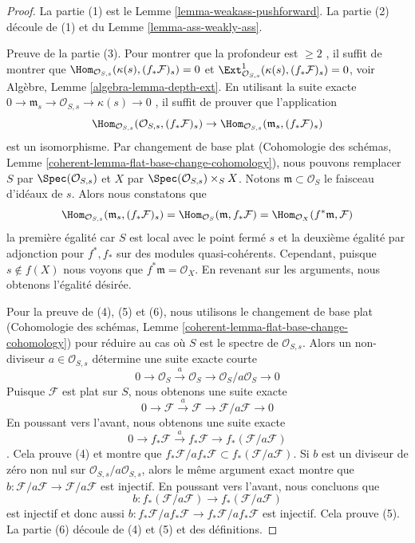 \begin{proof}
La partie (1) est le Lemme  \ref{lemma-weakass-pushforward}. La partie (2) découle de (1) et du Lemme
 \ref{lemma-ass-weakly-ass}.

\medskip\noindent
Preuve de la partie (3). Pour montrer que la profondeur est  $\geq 2$ , il
suffit de montrer que  $\Hom_{\mathcal{O}_{S, s}}(\kappa(s), (f_*\mathcal{F})_s) = 0$  et  $\Ext^1_{\mathcal{O}_{S, s}}(\kappa(s), (f_*\mathcal{F})_s) = 0$, voir Algèbre, Lemme
 \ref{algebra-lemma-depth-ext}. En utilisant la suite exacte  $0 \to \mathfrak m_s \to \mathcal{O}_{S, s} \to \kappa(s) \to 0$ , il suffit de prouver que
l'application
$$
\Hom_{\mathcal{O}_{S, s}}(\mathcal{O}_{S, s}, (f_*\mathcal{F})_s)
\to
\Hom_{\mathcal{O}_{S, s}}(\mathfrak m_s, (f_*\mathcal{F})_s)
$$
est un isomorphisme. Par changement de base plat (Cohomologie des schémas, Lemme
 \ref{coherent-lemma-flat-base-change-cohomology}), nous pouvons remplacer  $S$  par  $\Spec(\mathcal{O}_{S, s})$  et
 $X$  par  $\Spec(\mathcal{O}_{S, s}) \times_S X$. Notons  $\mathfrak m \subset \mathcal{O}_S$  le faisceau d'idéaux de
 $s$. Alors nous constatons que
$$
\Hom_{\mathcal{O}_{S, s}}(\mathfrak m_s, (f_*\mathcal{F})_s) =
\Hom_{\mathcal{O}_S}(\mathfrak m, f_*\mathcal{F}) =
\Hom_{\mathcal{O}_X}(f^*\mathfrak m, \mathcal{F})
$$
la première égalité car  $S$  est local avec le point fermé  $s$  et
la deuxième égalité par adjonction pour  $f^*, f_*$  sur des modules
quasi-cohérents. Cependant, puisque  $s \not \in f(X)$  nous voyons que  $f^*\mathfrak m = \mathcal{O}_X$. En
revenant sur les arguments, nous obtenons l'égalité désirée.

\medskip\noindent
Pour la preuve de (4), (5) et (6), nous utilisons le changement de base plat
(Cohomologie des schémas, Lemme  \ref{coherent-lemma-flat-base-change-cohomology}) pour réduire au cas où  $S$ 
est le spectre de  $\mathcal{O}_{S, s}$. Alors un non-diviseur  $a \in \mathcal{O}_{S, s}$  détermine une
suite exacte courte
$$
0 \to \mathcal{O}_S \xrightarrow{a} \mathcal{O}_S \to
\mathcal{O}_S/a \mathcal{O}_S \to 0
$$
Puisque  $\mathcal{F}$  est plat sur  $S$, nous obtenons une suite exacte
$$
0 \to \mathcal{F} \xrightarrow{a} \mathcal{F} \to
\mathcal{F}/a\mathcal{F} \to 0
$$
En poussant vers l'avant, nous obtenons une suite exacte
$$
0 \to f_*\mathcal{F} \xrightarrow{a} f_*\mathcal{F} \to
f_*(\mathcal{F}/a\mathcal{F})
$$
. Cela prouve (4) et montre que  $f_*\mathcal{F}/ af_*\mathcal{F} \subset f_*(\mathcal{F}/a\mathcal{F})$. Si  $b$  est un diviseur de
zéro non nul sur  $\mathcal{O}_{S, s}/a\mathcal{O}_{S, s}$, alors le même argument exact montre que
 $b : \mathcal{F}/a\mathcal{F} \to \mathcal{F}/a\mathcal{F}$  est injectif. En poussant vers l'avant, nous concluons que
$$
b : f_*(\mathcal{F}/a\mathcal{F}) \to f_*(\mathcal{F}/a\mathcal{F})
$$
est injectif et donc aussi  $b : f_*\mathcal{F}/ af_*\mathcal{F} \to f_*\mathcal{F}/ af_*\mathcal{F}$  est injectif. Cela prouve (5). La partie
(6) découle de (4) et (5) et des définitions.
\end{proof}











